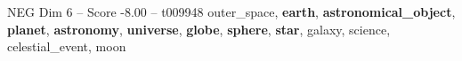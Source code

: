 \begin{textsample}{NEG Dim 6 – Score -8.00 – t009948}  \label{ex:f6_neg_039}
outer\_space, \textbf{earth}, \textbf{astronomical\_object}, \textbf{planet}, \textbf{astronomy}, \textbf{universe}, \textbf{globe}, \textbf{sphere}, \textbf{star}, galaxy, science, celestial\_event, moon

\end{textsample}
